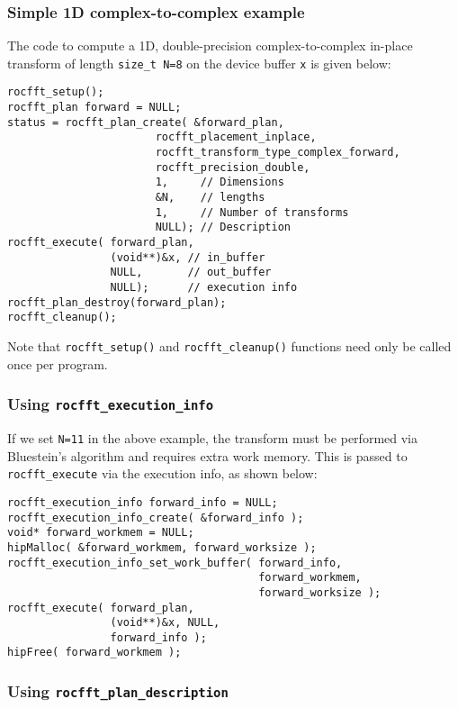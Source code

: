 \documentclass[10pt]{article}
\renewcommand{\(}{\left(}
\renewcommand{\)}{\right)}
\begin{document}
\subsubsection{Simple 1D complex-to-complex example}
The code to compute a 1D, double-precision complex-to-complex in-place
transform of length \lstinline{size_t N=8} on the device buffer
\lstinline{x} is given below:
\begin{lstlisting}
rocfft_setup();
rocfft_plan forward = NULL;
status = rocfft_plan_create( &forward_plan,
                       rocfft_placement_inplace,
                       rocfft_transform_type_complex_forward,
                       rocfft_precision_double,
                       1,     // Dimensions
                       &N,    // lengths
                       1,     // Number of transforms
                       NULL); // Description
rocfft_execute( forward_plan,
                (void**)&x, // in_buffer
                NULL,       // out_buffer
                NULL);      // execution info
rocfft_plan_destroy(forward_plan);
rocfft_cleanup();
\end{lstlisting}
Note that \lstinline{rocfft_setup()} and \lstinline{rocfft_cleanup()}
functions need only be called once per program.


\subsubsection{Using \lstinline{rocfft_execution_info}}
If we set \lstinline{N=11} in the above example, the transform
must be performed via Bluestein's algorithm and requires extra work
memory.  This is passed to \lstinline{rocfft_execute} via the
execution info, as shown below:
\begin{lstlisting}
rocfft_execution_info forward_info = NULL;
rocfft_execution_info_create( &forward_info );
void* forward_workmem = NULL;
hipMalloc( &forward_workmem, forward_worksize );
rocfft_execution_info_set_work_buffer( forward_info,
                                       forward_workmem,
                                       forward_worksize );
rocfft_execute( forward_plan,
                (void**)&x, NULL,
                forward_info );
hipFree( forward_workmem );
\end{lstlisting}

\subsubsection{Using \lstinline{rocfft_plan_description}}
\end{document}
